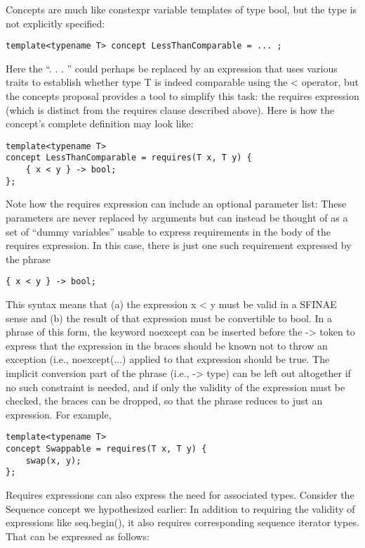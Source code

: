 Concepts are much like constexpr variable templates of type bool, but the type is not explicitly specified:

\begin{lstlisting}[style=styleCXX]
template<typename T> concept LessThanComparable = ... ;
\end{lstlisting}

Here the “. . . ” could perhaps be replaced by an expression that uses various traits to establish whether type T is indeed comparable using the < operator, but the concepts proposal provides a tool to simplify this task: the requires expression (which is distinct from the requires clause described above). Here is how the concept’s complete definition may look like:

\begin{lstlisting}[style=styleCXX]
template<typename T>
concept LessThanComparable = requires(T x, T y) {
	{ x < y } -> bool;
};
\end{lstlisting}

Note how the requires expression can include an optional parameter list: These parameters are never replaced by arguments but can instead be thought of as a set of “dummy variables” usable to express requirements in the body of the requires expression. In this case, there is just one such requirement expressed by the phrase

\begin{lstlisting}[style=styleCXX]
{ x < y } -> bool;
\end{lstlisting}

This syntax means that (a) the expression x < y must be valid in a SFINAE sense and (b) the result of that expression must be convertible to bool. In a phrase of this form, the keyword noexcept can be inserted before the -> token to express that the expression in the braces should be known not to throw an exception (i.e., noexcept(...) applied to that expression should be true. The implicit conversion part of the phrase (i.e., -> type) can be left out altogether if no such constraint is needed, and if only the validity of the expression must be checked, the braces can be dropped, so that the phrase reduces to just an expression. For example,

\begin{lstlisting}[style=styleCXX]
template<typename T>
concept Swappable = requires(T x, T y) {
	swap(x, y);
};
\end{lstlisting}

Requires expressions can also express the need for associated types. Consider the Sequence concept we hypothesized earlier: In addition to requiring the validity of expressions like seq.begin(), it also requires corresponding sequence iterator types. That can be expressed as follows:

